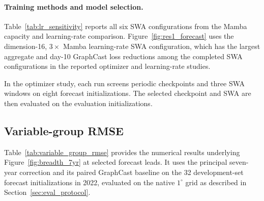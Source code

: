 \documentclass{article}
\begin{document}
\paragraph{Training methods and model selection.}
{Table~\ref{tab:lr_sensitivity} reports all six SWA configurations from the Mamba capacity and learning-rate comparison.} Figure~\ref{fig:res1_forecast} uses the dimension-16, $3\times$ Mamba learning-rate SWA configuration, which has the largest aggregate and day-10 {GraphCast loss} reductions among the completed SWA configurations in the reported optimizer and learning-rate studies.

{In the optimizer study, each run screens periodic checkpoints and three SWA windows on eight forecast initializations.} The selected checkpoint and SWA are then evaluated on the evaluation initializations.

\subsection{Variable-group RMSE}
\label{app:variable_group_rmse}

Table~\ref{tab:variable_group_rmse} provides the numerical results underlying Figure~\ref{fig:breadth_7yr} at selected forecast leads. It uses the principal seven-year correction and its paired GraphCast baseline on the 32 development-set forecast initializations in 2022, evaluated on the native $1^\circ$ grid as described in Section~\ref{sec:eval_protocol}.
\end{document}
